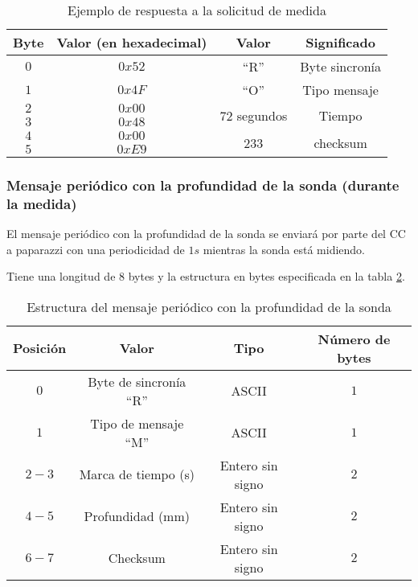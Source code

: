 \begin{table}
	\centering
	\caption{Ejemplo de respuesta a la solicitud de medida}
	\begin{tabular}{|c|c|c|c|}\hline
		\textbf{Byte} 	&	\textbf{Valor (en hexadecimal)}	&\textbf{Valor}	&\textbf{Significado} \\ \hline \hline
		$0$ 			&  $0x52$			& ``R''	& Byte sincronía	\\ \hline
		$1$				&  $0x4F$			& ``O''	& Tipo mensaje		\\ \hline
		$2$				&  $0x00$			& \multirow{2}{*}{$72$ segundos} & \multirow{2}{*}{Tiempo} \\
		$3$				&  $0x48$			&  & \\ \hline	
		$4$				&  $0x00$			&  \multirow{2}{*}{233}	& \multirow{2}{*}{checksum} \\
		$5$				&  $0xE9$			&     &     \\ \hline	
		
		
	\end{tabular}
	\label{tab9}
\end{table}

\subsubsection{Mensaje periódico con la profundidad de la sonda (durante la medida)}

El mensaje periódico con la profundidad de la sonda se enviará por parte del CC a paparazzi con una periodicidad de $1s$ mientras la sonda está midiendo.

Tiene una longitud de $8$ bytes y la estructura en bytes especificada en la tabla \ref{tab10}.

\begin{table}[h]
	\centering
	\caption{Estructura del mensaje periódico con la profundidad de la sonda}
	\begin{tabular}{|c|c|c|c|}\hline 
		\textbf{Posición}	& \textbf{Valor} & \textbf{Tipo} &\textbf{Número de bytes} \\ \hline \hline 
		$0$		& Byte de sincronía ``R''				& ASCII	 			&	$1$ \\  \hline
		$1$		& Tipo de mensaje ``M''				& ASCII	 			&	$1$ \\  \hline
		$2-3$	& Marca de tiempo (s)				& Entero sin signo	&   $2$ \\  \hline
		$4-5$	& Profundidad (mm)  				& Entero sin signo	&   $2$ \\  \hline
		$6-7$	& Checksum 							& Entero sin signo	&   $2$ \\  \hline
	\end{tabular}
\label{tab10}
\end{table}

